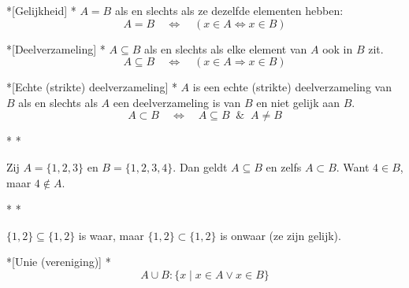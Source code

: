 
\begin{nicedefinition}*[Gelijkheid]
    \nextpart[Gelijkheid:]*
    $A = B$ als en slechts als ze dezelfde elementen hebben:
    \begin{equation*}
        A = B \quad \Leftrightarrow \quad (x \in A \Leftrightarrow x \in B)
    \end{equation*}
\end{nicedefinition}

\begin{nicedefinition}*[Deelverzameling]
    \nextpart[Deelverzameling:]*
    $A \subseteq B$ als en slechts als elke element van $A$ ook in $B$ zit.
    \begin{equation*}
        A \subseteq B \quad \Leftrightarrow \quad (x \in A \Rightarrow x \in B)
    \end{equation*}
\end{nicedefinition}

\begin{nicedefinition}*[Echte (strikte) deelverzameling]
    *
    $A$ is een echte (strikte) deelverzameling van $B$ als en slechts als $A$ een deelverzameling is van $B$ en niet gelijk aan $B$.
    \begin{equation*}
        A \subset B \quad \Leftrightarrow \quad A \subseteq B \;\;\&\;\; A \neq B
    \end{equation*}
\end{nicedefinition}

\begin{niceexample}*
    \nextpart[]*

    Zij $A = \{1, 2, 3\}$ en $B = \{1, 2, 3, 4\}$. Dan geldt $A \subseteq B$ en zelfs $A \subset B$. Want $4 \in B$, maar $4 \notin A$.
\end{niceexample}

\begin{niceexample}*
    \nextpart[]*

    $\{1, 2\} \subseteq \{1, 2\}$ is waar, maar $\{1, 2\} \subset \{1, 2\}$ is onwaar (ze zijn gelijk).
\end{niceexample}


\begin{nicedefinition}*[Unie (vereniging)]
    \nextpart[Unie:]*
    \begin{equation*}
        A \cup B : \{x \mid x \in A \lor x \in B\}
    \end{equation*}
\end{nicedefinition}


